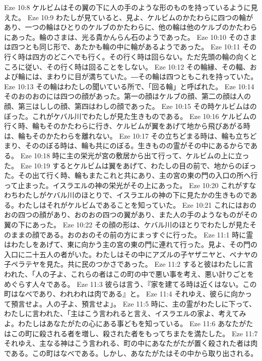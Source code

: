 Eze 10:8  ケルビムはその翼の下に人の手のような形のものを持っているように見えた。
Eze 10:9  わたしが見ていると、見よ、ケルビムのかたわらに四つの輪があり、一つの輪はひとりのケルブのかたわらに、他の輪は他のケルブのかたわらにあった。輪のさまは、光る貴かんらん石のようであった。
Eze 10:10  そのさまは四つとも同じ形で、あたかも輪の中に輪があるようであった。
Eze 10:11  その行く時は四方のどこへでも行く。その行く時は回らない。ただ先頭の輪の向くところに従い、その行く時は回ることをしない。
Eze 10:12  その輪縁、その輻、および輪には、まわりに目が満ちていた。―その輪は四つともこれを持っていた。
Eze 10:13  その輪はわたしの聞いている所で、「回る輪」と呼ばれた。
Eze 10:14  そのおのおのには四つの顔があった。第一の顔はケルブの顔、第二の顔は人の顔、第三はししの顔、第四はわしの顔であった。
Eze 10:15  その時ケルビムはのぼった。これがケバル川でわたしが見た生きものである。
Eze 10:16  ケルビムの行く時、輪もそのかたわらに行き、ケルビムが翼をあげて地から飛びあがる時は、輪もそのかたわらを離れない。
Eze 10:17  その立ちどまる時は、輪も立ちどまり、そののぼる時は、輪も共にのぼる。生きものの霊がその中にあるからである。
Eze 10:18  時に主の栄光が宮の敷居から出て行って、ケルビムの上に立った。
Eze 10:19  するとケルビムは翼をあげて、わたしの目の前で、地からのぼった。その出て行く時、輪もまたこれと共にあり、主の宮の東の門の入口の所へ行って止まった。イスラエルの神の栄光がその上にあった。
Eze 10:20  これがすなわちわたしがケバル川のほとりで、イスラエルの神の下に見たかの生きものである。わたしはそれがケルビムであることを知っていた。
Eze 10:21  これにはおのおの四つの顔があり、おのおの四つの翼があり、また人の手のようなものがその翼の下にあった。
Eze 10:22  その顔の形は、ケバル川のほとりでわたしが見たそのままの顔である。おのおのその前の方にまっすぐに行った。
Eze 11:1  時に霊はわたしをあげて、東に向かう主の宮の東の門に連れて行った。見よ、その門の入口に二十五人の者がいた。わたしはその中にアズルの子ヤザニヤと、ベナヤの子ペラテヤを見た。共に民のつかさであった。
Eze 11:2  すると彼はわたしに言われた、「人の子よ、これらの者はこの町の中で悪い事を考え、悪い計りごとをめぐらす人々である。
Eze 11:3  彼らは言う、『家を建てる時は近くはない。この町はなべであり、われわれは肉である』と。
Eze 11:4  それゆえ、彼らに向かって預言せよ。人の子よ、預言せよ」。
Eze 11:5  時に、主の霊がわたしに下って、わたしに言われた、「主はこう言われると言え、イスラエルの家よ、考えてみよ。わたしはあなたがたの心にある事どもを知っている。
Eze 11:6  あなたがたはこの町に殺される者を増し、殺された者をもってちまたを満たした。
Eze 11:7  それゆえ、主なる神はこう言われる、町の中にあなたがたが置く殺された者は肉である。この町はなべである。しかし、あなたがたはその中から取り出される。
